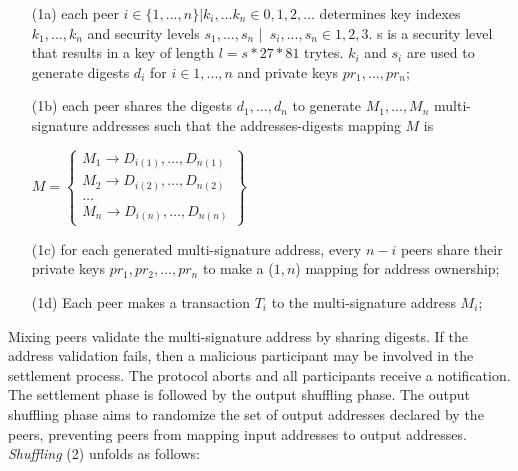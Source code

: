 \begin{enumerate}
  \item[(1a)] each peer $i \in \{1,..., n\} | k_{i},... k_{n} \in {0,1,2,... } $ determines key indexes $k_{1},..., k_{n}$
  and security levels $ s_{1},..., s_{n}$ | $s _{i},..., s_{n} \in {1, 2, 3}$. s is a security level that results in a 
  key of length $ l = s * 27 * 81$ trytes. $k_{i}$ and $s_{i}$ are used to generate digests $d_{i}$ for $i \in {1,..., n}
  $ and private keys $ pr_{1},..., pr_{n}$;
  \item[(1b)] each peer shares the digests $d_{1},..., d_{n}$ to generate $M_{1},...,M_{n}$ multi-signature addresses such that the addresses-digests mapping $M$ is
  \begin{center}
    $M = \left\{\begin{array}{l}M_1 \rightarrow D_{i(1)}, \ldots, D_{n(1)} \\ M_2 \rightarrow D_{i(2)}, \ldots, D_{n(2)} \\ \ldots \\ M_n \rightarrow D_{i(n)}, \ldots, D_{n(n)}\end{array}\right\}$
  \end{center}
  \item[(1c)] for each generated multi-signature address, every $n - i$ peers share their private keys $pr_{1}, pr_{2},..., pr_{n}$ to make a ($1,n$) 
   mapping for address ownership;
   \item[(1d)] Each peer makes a transaction $T_{i}$ to the multi-signature address $M_{i}$;
\end{enumerate}

Mixing peers validate the multi-signature address by sharing digests. If the address validation fails, then a malicious participant may be 
involved in the settlement process. The protocol aborts and all participants receive a notification. The settlement phase is followed by 
the output shuffling phase. The output shuffling phase aims to randomize the set of output addresses declared by the peers, 
preventing peers from mapping input addresses to output addresses. \emph{Shuffling} (2) unfolds as follows:

